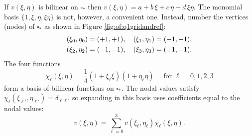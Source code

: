 If $v(\xi,\eta)$ is bilinear on $\square_\ast$ then $v(\xi,\eta) = a + b\, \xi + c\, \eta + d\, \xi \eta$.  The monomial basis $\{1,\xi,\eta,\xi\eta\}$ is not, however, a convenient one.  Instead, number the vertices (nodes) of $\square_\ast$ as shown in Figure \ref{fig:of:q1gridandref}:
\begin{align}
(\xi_0,\eta_0) &= (+1,+1), \quad (\xi_1,\eta_1) = (-1,+1),    \label{eq:of:refcorners} \\
(\xi_2,\eta_2) &= (-1,-1), \quad (\xi_3,\eta_3) = (+1,-1). \notag
\end{align}
The four functions
\begin{equation}
\chi_\ell(\xi,\eta) = \frac{1}{4} \left(1 + \xi_\ell \xi\right) \left(1 + \eta_\ell \eta\right)  \quad \text{ for } \ell=0,1,2,3 \label{eq:of:chidefn}
\end{equation}
form a basis of bilinear functions on $\square_\ast$.  The nodal values satisfy $\chi_\ell(\xi_{\ell'},\eta_{\ell'}) = \delta_{\ell\ell'}$ so expanding in this basis uses coefficients equal to the nodal values:
\begin{equation}
v(\xi,\eta) = \sum_{\ell=0}^3 v(\xi_\ell,\eta_\ell) \chi_\ell(\xi,\eta). \label{eq:of:bilinearrepresentationref}
\end{equation}

